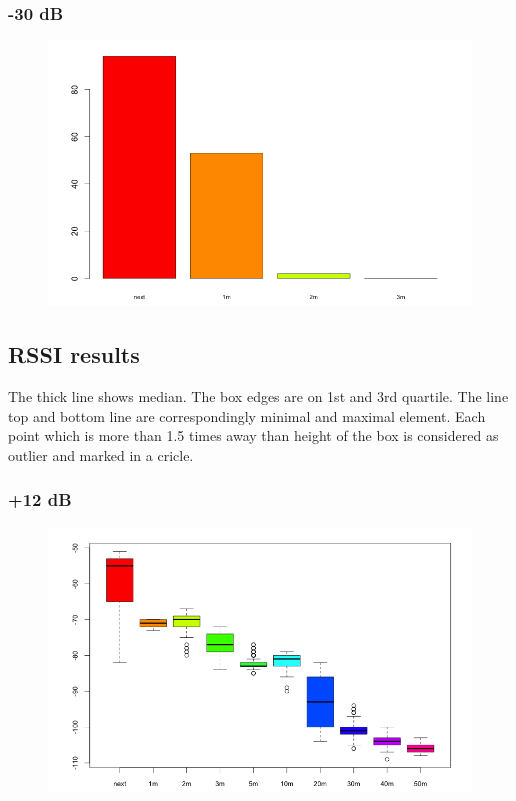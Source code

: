 \subsubsection{-30 dB}

\begin{figure}[H]
  \centering
  \includegraphics[width=1.0\textwidth]{img/tests/range/db_m30.png}
\end{figure}

\subsection{RSSI results}

The thick line shows median. The box edges are on 1st and 3rd quartile. The line top and bottom line are correspondingly minimal and maximal element. Each point which is more than 1.5 times away than height of the box is considered as outlier and marked in a cricle.

\subsubsection{+12 dB}

\begin{figure}[H]
  \centering
  \includegraphics[width=1.0\textwidth]{img/tests/rssi/db_12.png}
\end{figure}



